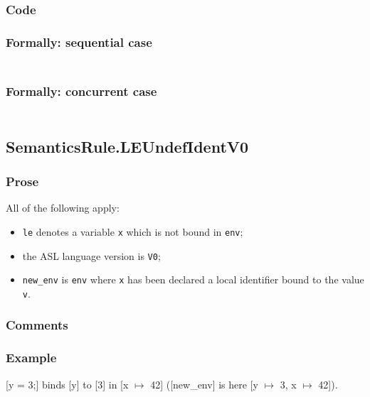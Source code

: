 \documentclass{book}
\begin{document}
  \subsubsection{Code}

  \subsubsection{Formally: sequential case}
  \begin{align}
  \end{align} 

  \subsubsection{Formally: concurrent case}
  \begin{align}
  \end{align} 

\subsection{SemanticsRule.LEUndefIdentV0 \label{sec:SemanticsRule.LEUndefIdentV0}}

    \subsubsection{Prose}
    All of the following apply:
    \begin{itemize}
    \item \texttt{le} denotes a variable \texttt{x} which is not bound in \texttt{env};
    \item the ASL language version is \texttt{V0};
    \item \texttt{new\_env} is \texttt{env} where \texttt{x} has been declared
a local identifier bound to the value \texttt{v}.
    \end{itemize}

  \subsubsection{Comments}

  \subsubsection{Example}
  [y = 3;] binds [y] to [3] in [x $\mapsto$ 42] ([new\_env] is here [y $\mapsto$ 3, x $\mapsto$ 42]).
\end{document}
